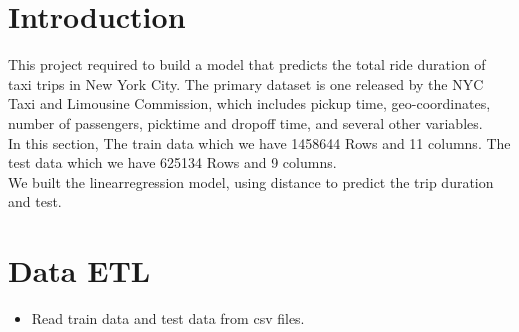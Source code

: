 \section{Introduction}\label{sec-intro}

This project required to build a model that predicts the total ride duration of taxi trips in New York City. The primary dataset is one released by the NYC Taxi and Limousine Commission, which includes pickup time, geo-coordinates, number of passengers, picktime and dropoff time, and several other variables.
\\In this section, The train data which we have 1458644 Rows and 11 columns. The test data which we have 625134 Rows and 9 columns.
\\We built the linearregression model, using distance to predict the trip duration and test.

\section{Data ETL} 

\begin{itemize}
	\item
     Read train data and test data from csv files.
	
\end{itemize} 


